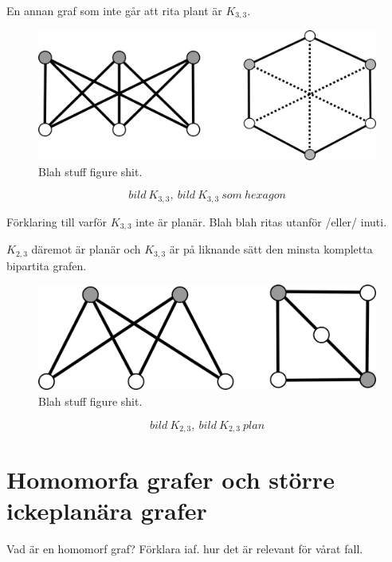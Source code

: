 \documentclass[a4paper,11pt]{article}
\begin{document}
En annan graf som inte går att rita plant är $K_{3,3}$.

\begin{figure}[!ht]
	\begin{center}
		\includegraphics{fig6}
		\caption{Blah stuff figure shit.}
		\label{fig6}
	\end{center}
\end{figure}
\FloatBarrier

$$bild\ K_{3,3},\ bild\ K_{3,3}\ som\ hexagon$$

Förklaring till varför $K_{3,3}$ inte är planär. Blah blah ritas utanför /eller/ inuti.

$K_{2,3}$ däremot är planär och $K_{3,3}$ är på liknande sätt den minsta kompletta bipartita grafen. 

\begin{figure}[!ht]
	\begin{center}
		\includegraphics{fig7}
		\caption{Blah stuff figure shit.}
		\label{fig7}
	\end{center}
\end{figure}
\FloatBarrier

$$bild\ K_{2,3},\ bild\ K_{2,3}\ plan$$

\section*{Homomorfa grafer och större ickeplanära grafer}

Vad är en homomorf graf? Förklara iaf. hur det är relevant för vårat fall.
\end{document}
